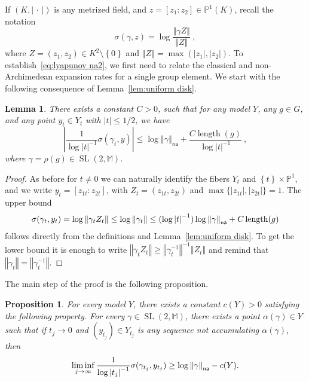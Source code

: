 \documentclass[10pt]{amsart}
\newtheorem{lemm}[theo]{Lemma}\newtheorem{prop}[theo]{Proposition}\newtheorem{coro}[theo]{Corollary}\newtheorem{conj}[theo]{Conjecture}
\theoremstyle{definition}\newtheorem{defi}[theo]{Definition}\newtheorem{rema}[theo]{Remark}\newtheorem{exam}[theo]{Example}\newtheorem{exem}[theo]{Example}\newtheorem{nota}[theo]{Notation}
\DeclareMathOperator{\length}{length}
\DeclareMathOperator{\SL}{SL}
\newcommand{\mm}{\mathbb{M}}
\newcommand{\cv}{\rightarrow}
\newcommand{\set}[1]{\left\{#1\right\}}
\newcommand{\norm}[1]{\left\Vert#1\right\Vert}
\newcommand{\abs}[1]{\left\vert#1\right\vert}
\newcommand{\pu}{{\mathbb{P}^1}}
\newcommand{\PP}{\mathbb{P}}
\newcommand{\unsur}[1]{\frac{1}{#1}}
\newcommand{\na}{\mathsf{na}}
\newcommand{\inv}{^{-1}}
\begin{document}
If $(K, \abs{{\,\cdot\,}})$ is any metrized field, and $z =[z_1:z_2]\in \PP^1(K)$, recall the notation
\[
\sigma(\gamma, z) = \log \frac{\norm{\gamma Z}}{\norm{Z}}~,
\]
where $Z=(z_1, z_2)\in K^2\setminus\set{0}$ and $\norm{Z} = \max(\abs{z_1}, \abs{z_2})$. To establish~\eqref{eq:lyapunov na2}, we first need to relate the classical and non-Archimedean expansion rates for a single group element. We start with the following consequence of Lemma~\ref{lem:uniform disk}.

\begin{lemm}\label{lem:sup2}
There exists a constant $C>0$, such that for any model $Y$, any $g\in G$, and any point $y_{t}\in Y_{t}$ with $|t|\le 1/2$, we have
\begin{equation}\label{eq:sup2}
\abs{\frac{1}{\log|t|^{-1}} \sigma(\gamma_t, y)}
\leq
\log \norm{\gamma}_\na + \frac{C \length (g)}{\log\abs{t}\inv}~,
\end{equation}
where $\gamma = \rho(g) \in \SL(2,\mm)$.
\end{lemm}

\begin{proof}
As before for $t\neq 0$ we can naturally identify the fibers $Y_t$ and $\set{t}\times \pu$, and we write $y_t = [z_{1t}:z_{2t}]$, with $Z_t = (z_{1t}, z_{2t})$ and $\max\{ |z_{1t}|, |z_{2t}|\} =1$. The upper bound
\[
\sigma(\gamma_t, y_{t}) = \log\norm{\gamma_t Z_t} \leq \log\norm{\gamma_t} \le
(\log\abs{t}\inv) \log\norm{\gamma}_{\sf na} + C \length (g)
\]
follows directly from the definitions and Lemma~\ref{lem:uniform disk}. To get the lower bound it is enough to write $ \norm{\gamma_t Z_t} \geq \norm{\gamma_t\inv}\inv \norm{Z_t}$ and remind that $\norm{\gamma_t} = \norm{\gamma_t\inv}$.
\end{proof}

The main step of the proof is the following proposition.

\begin{prop}\label{prop:hybrid}
For every model $Y$, there exists a constant $c(Y)>0$ satisfying the following property. For every $\gamma \in \SL(2, \mm)$, there exists a point $\alpha(\gamma)\in Y$ such that if $t_j\cv0$ and $(y_{t_j})\in Y_{t_j}$ is any sequence not accumulating $\alpha(\gamma)$, then
\begin{equation}\label{eq:norm}
\liminf_{j\cv\infty} \unsur{\log\abs{t_j}\inv} \sigma(\gamma_{t_j}, y_{t_j}) \geq \log\norm{\gamma}_{\sf na} - c(Y).
\end{equation}
\end{prop}
\end{document}
